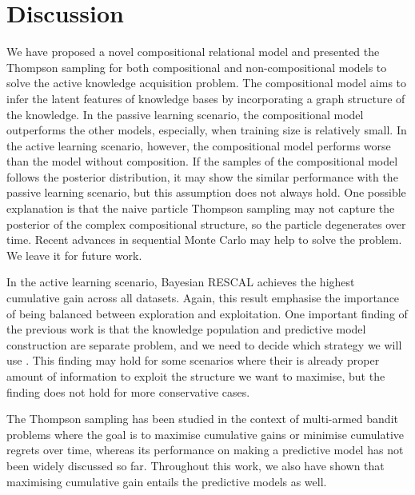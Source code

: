 \section{Discussion}
We have proposed a novel compositional relational model and presented the
Thompson sampling for both compositional and non-compositional models to solve the active knowledge acquisition 
problem. The compositional model aims to infer the latent features of knowledge 
bases by incorporating a graph structure of the knowledge. In the passive 
learning scenario, the compositional model outperforms the other models, 
especially, when training size is relatively small. In the active learning 
scenario, however, the compositional model performs worse than the model without 
composition. If the samples of the compositional model follows the posterior 
distribution, it may show the similar performance with the passive learning 
scenario, but this assumption does not always hold. One possible explanation is 
that the naive particle Thompson sampling may not capture the posterior of the 
complex compositional structure, so the particle degenerates over time. Recent
 advances in sequential Monte Carlo may help to solve the problem\cite{gu2015neural,naesseth2014sequential,lindsten2014divide}. 
We leave it  for future work.
 
In the active learning scenario, Bayesian RESCAL achieves the highest 
cumulative gain across all datasets. Again, this result emphasise the 
importance of being balanced between exploration and exploitation. One 
important finding of the previous work is that the knowledge population 
and predictive model construction are separate problem, and we need to 
decide which strategy we will use \cite{kajino2015active}. This finding
may hold for some scenarios where their is already proper amount of 
information to exploit the structure we want to maximise, but the finding 
does not hold for more conservative cases.

The Thompson sampling has been studied in the context of multi-armed bandit 
problems where the goal is to maximise cumulative gains or minimise cumulative 
regrets over time, whereas its performance on making a predictive model has not 
been widely discussed so far. Throughout this work, we also have shown that 
maximising cumulative gain entails the predictive models as well.

